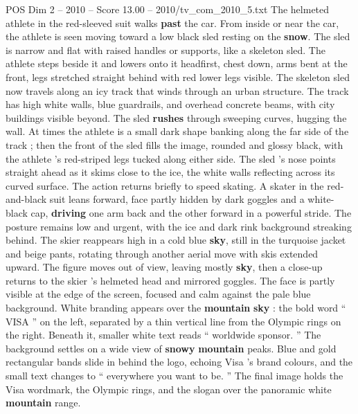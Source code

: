 \begin{textsample}{POS Dim 2 – 2010 – Score 13.00 – 2010/tv\_com\_2010\_5.txt}
The helmeted athlete in the red-sleeved suit walks \textbf{past} the car.
From inside or near the car, the athlete is seen moving toward a low black sled resting on the \textbf{snow}.
The sled is narrow and flat with raised handles or supports, like a skeleton sled.
The athlete steps beside it and lowers onto it headfirst, chest down, arms bent at the front, legs stretched straight behind with red lower legs visible.
The skeleton sled now travels along an icy track that winds through an urban structure.
The track has high white walls, blue guardrails, and overhead concrete beams, with city buildings visible beyond.
The sled \textbf{rushes} through sweeping curves, hugging the wall.
At times the athlete is a small dark shape banking along the far side of the track ; then the front of the sled fills the image, rounded and glossy black, with the athlete ’s red-striped legs tucked along either side.
The sled ’s nose points straight ahead as it skims close to the ice, the white walls reflecting across its curved surface.
The action returns briefly to speed skating.
A skater in the red-and-black suit leans forward, face partly hidden by dark goggles and a white-black cap, \textbf{driving} one arm back and the other forward in a powerful stride.
The posture remains low and urgent, with the ice and dark rink background streaking behind.
The skier reappears high in a cold blue \textbf{sky}, still in the turquoise jacket and beige pants, rotating through another aerial move with skis extended upward.
The figure moves out of view, leaving mostly \textbf{sky}, then a close-up returns to the skier ’s helmeted head and mirrored goggles.
The face is partly visible at the edge of the screen, focused and calm against the pale blue background.
White branding appears over the \textbf{mountain} \textbf{sky} : the bold word “ VISA ” on the left, separated by a thin vertical line from the Olympic rings on the right.
Beneath it, smaller white text reads “ worldwide sponsor. ” The background settles on a wide view of \textbf{snowy} \textbf{mountain} peaks.
Blue and gold rectangular bands slide in behind the logo, echoing Visa ’s brand colours, and the small text changes to “ everywhere you want to be. ” The final image holds the Visa wordmark, the Olympic rings, and the slogan over the panoramic white \textbf{mountain} range.

\end{textsample}
